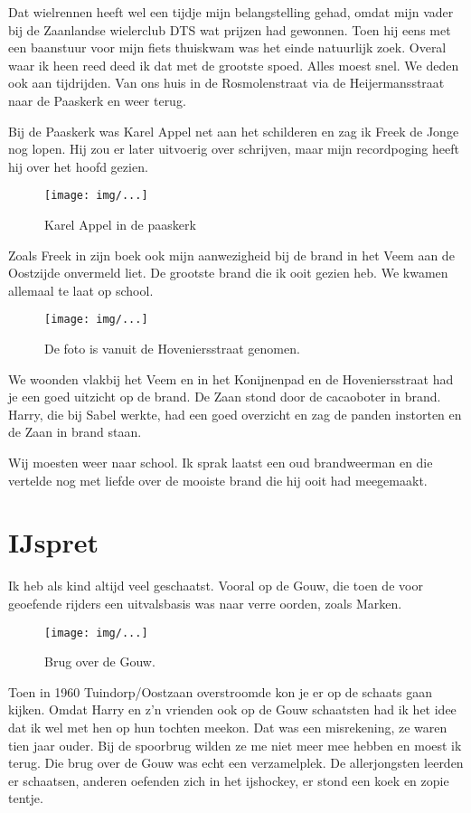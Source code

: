 \documentclass[10pt,twoside,openright]{memoir}
\begin{document}
Dat wielrennen heeft wel een tijdje mijn belangstelling gehad, omdat mijn vader bij de Zaanlandse wielerclub DTS wat prijzen had gewonnen. Toen hij eens met een baanstuur voor mijn fiets thuiskwam was het einde natuurlijk zoek. Overal waar ik heen reed deed ik dat met de grootste spoed. Alles moest snel. We deden ook aan tijdrijden. Van ons huis in de Rosmolenstraat via de Heijermansstraat naar de Paaskerk en weer terug.

Bij de Paaskerk was Karel Appel net aan het schilderen en zag ik Freek de Jonge nog lopen. Hij zou er later uitvoerig over schrijven, maar mijn recordpoging heeft hij over het hoofd gezien. 

\begin{figure}[t]
\texttt{[image: img/...]}
\caption{Karel Appel in de paaskerk}
\end{figure}

Zoals Freek in zijn boek ook mijn aanwezigheid bij de brand in het Veem aan de Oostzijde onvermeld liet. De grootste brand die ik ooit gezien heb. We kwamen allemaal te laat op school. 

\begin{figure}[t]
\texttt{[image: img/...]}
\caption{De foto is vanuit de Hoveniersstraat genomen.}
\end{figure}

We woonden vlakbij het Veem en in het Konijnenpad en de Hoveniersstraat had je een goed uitzicht op de brand. De Zaan stond door de cacaoboter in brand. Harry, die bij Sabel werkte, had een goed overzicht en zag de panden instorten en de Zaan in brand staan.

Wij moesten weer naar school. Ik sprak laatst een oud brandweerman en die vertelde nog met liefde over de mooiste brand die hij ooit had meegemaakt. 

\chapter{IJspret} %
\label{cha:ijspret}

Ik heb als kind altijd veel geschaatst. Vooral op de Gouw, die toen de voor geoefende rijders een uitvalsbasis was naar verre oorden, zoals Marken.

\begin{figure}[t]
\texttt{[image: img/...]}
\caption{Brug over de Gouw.}
\end{figure}

Toen in 1960 Tuindorp/Oostzaan overstroomde kon je er op de schaats gaan kijken. Omdat Harry en z’n vrienden ook op de Gouw schaatsten had ik het idee dat ik wel met hen op hun tochten meekon. Dat was een misrekening, ze waren tien jaar ouder. Bij de spoorbrug wilden ze me niet meer mee hebben en moest ik terug. Die brug over de Gouw was echt een verzamelplek. De allerjongsten leerden er schaatsen, anderen oefenden zich in het ijshockey, er stond een koek en zopie tentje.
\end{document}

